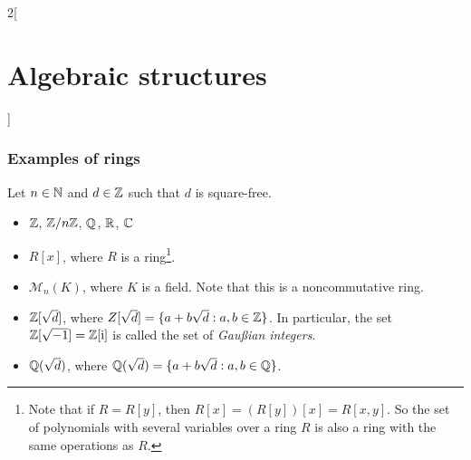\documentclass[../../../main.tex]{subfiles}
\begin{document}
\begin{multicols}{2}[\section{Algebraic structures}]
  \subsubsection*{Examples of rings}\label{AS-examples2}
  Let $n\in\mathbb{N}$ and $d\in\mathbb{Z}$ such that $d$ is square-free.
  \begin{itemize}
    \item $\mathbb{Z}$, $\mathbb{Z}/n\mathbb{Z}$, $\mathbb{Q}$, $\mathbb{R}$, $\mathbb{C}$
    \item $R[x]$, where $R$ is a ring\footnote{Note that if $R=R[y]$, then $R[x]=(R[y])[x]=R[x,y]$. So the set of polynomials with several variables over a ring $R$ is also a ring with the same operations as $R$.}.
    \item $\mathcal{M}_n(K)$, where $K$ is a field. Note that this is a noncommutative ring.
    \item $\mathbb{Z}[\sqrt{d}]$, where $Z[\sqrt{d}]=\{a+b\sqrt{d}:a,b\in\mathbb{Z}\}$. In particular, the set $\mathbb{Z}[\sqrt{-1}]=\mathbb{Z}[\mathrm{i}]$ is called the set of \textit{Gau\ss ian integers}.
    \item $\mathbb{Q}(\sqrt{d})$, where $\mathbb{Q}(\sqrt{d})=\{a+b\sqrt{d}:a,b\in\mathbb{Q}\}$.
  \end{itemize}
  \begin{center}
    \begin{minipage}{\linewidth}
      \centering
      
    \end{minipage}
  \end{center}
\end{multicols}
\end{document}
